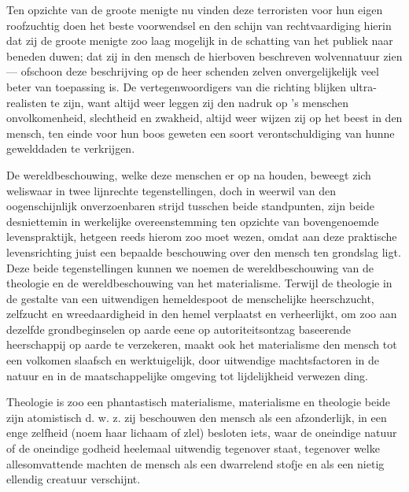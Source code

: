 \documentclass[a4paper, 12pt, oneside, dutch]{article}
\begin{document}
Ten opzichte van de groote menigte nu vinden deze terroristen voor hun eigen roofzuchtig doen het beste voorwendsel en den schijn van rechtvaardiging hierin dat zij de groote menigte zoo laag mogelijk in de schatting van het publiek naar beneden duwen; dat zij in den mensch de hierboven beschreven wolvennatuur zien --- ofschoon deze beschrijving op de heer schenden zelven onvergelijkelijk veel beter van toepassing is. De vertegenwoordigers van die richting blijken ultra-realisten te zijn, want altijd weer leggen zij den nadruk op 's menschen onvolkomenheid, slechtheid en zwakheid, altijd weer wijzen zij op het beest in den mensch, ten einde voor hun boos geweten een soort verontschuldiging van hunne gewelddaden te verkrijgen.

De wereldbeschouwing, welke deze menschen er op na houden, beweegt zich weliswaar in twee lijnrechte tegenstellingen, doch in weerwil van den oogenschijnlijk onverzoenbaren strijd tusschen beide standpunten, zijn beide desniettemin in werkelijke overeenstemming ten opzichte van bovengenoemde levenspraktijk, hetgeen reeds hierom zoo moet wezen, omdat aan deze praktische levensrichting juist een bepaalde beschouwing over den mensch ten grondslag ligt. Deze beide tegenstellingen kunnen we noemen de wereldbeschouwing van de theologie en de wereldbeschouwing van het materialisme. Terwijl de theologie in de gestalte van een uitwendigen hemeldespoot de menschelijke heerschzucht, zelfzucht en wreedaardigheid in den hemel verplaatst en verheerlijkt, om zoo aan dezelfde grondbeginselen op aarde eene op autoriteitsontzag baseerende heerschappij op aarde te verzekeren, maakt ook het materialisme den mensch tot een volkomen slaafsch en werktuigelijk, door uitwendige machtsfactoren in de natuur en in de maatschappelijke omgeving tot lijdelijkheid verwezen ding.

Theologie is zoo een phantastisch materialisme, materialisme en theologie beide zijn atomistisch d. w. z. zij beschouwen den mensch als een afzonderlijk, in een enge zelfheid (noem haar lichaam of zlel) besloten iets, waar de oneindige natuur of de oneindige godheid heelemaal uitwendig tegenover staat, tegenover welke allesomvattende machten de mensch als een dwarrelend stofje en als een nietig ellendig creatuur verschijnt.
\end{document}
